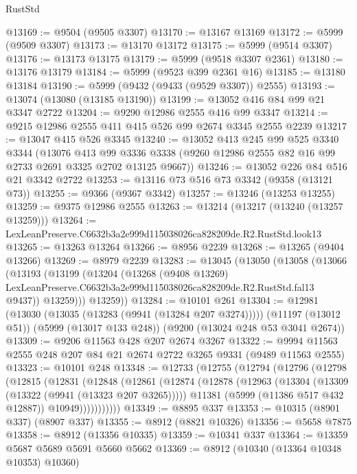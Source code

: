 \begin{lexlean}{RustStd}
\begin{coremodule}
@13169 := @9504 (@9505 @3307)
@13170 := @13167 @13169
@13172 := @5999 (@9509 @3307)
@13173 := @13170 @13172
@13175 := @5999 (@9514 @3307)
@13176 := @13173 @13175
@13179 := @5999 (@9518 @3307 @2361)
@13180 := @13176 @13179
@13184 := @5999 (@9523 @399 @2361 @16)
@13185 := @13180 @13184
@13190 := @5999 (@9432 (@9433 (@9529 @3307)) @2555)
@13193 := @13074 (@13080 (@13185 @13190))
@13199 := @13052 @416 @84 @99 @21 @3347 @2722
@13204 := @9290 @12986 @2555 @416 @99 @3347
@13214 := @9215 @12986 @2555 @411 @415 @526 @99 @2674 @3345 @2555 @2239
@13217 := @13047 @415 @526 @3345
@13240 := @13052
    @413
    @245
    @99
    @525
    @3340
    @3344
    (@13076
      @413
      @99
      @3336
      @3338
      (@9260 @12986 @2555 @82 @16 @99 @2733 @2691 @3325 @2702 @13125 @9667))
@13246 := @13052 @226 @84 @516 @21 @3342 @2722
@13253 := @13116 @73 @516 @73 @3342 (@9358 (@13121 @73))
@13255 := @9366 (@9367 @3342)
@13257 := @13246 (@13253 @13255)
@13259 := @9375 @12986 @2555
@13263 := @13214 (@13217 (@13240 (@13257 @13259)))
@13264 := LexLeanPreserve.C6632b3a2e999d115038026ca828209de.R2.RustStd.look13
@13265 := @13263 @13264
@13266 := @8956 @2239
@13268 := @13265 (@9404 @13266)
@13269 := @8979 @2239
@13283 := @13045
    (@13050
      (@13058
        (@13066
          (@13193
            (@13199
              (@13204
                (@13268
                  (@9408 @13269)
                  LexLeanPreserve.C6632b3a2e999d115038026ca828209de.R2.RustStd.fal13
                  @9437))
              @13259)))
        @13259))
@13284 := @10101 @261
@13304 := @12981
    (@13030 (@13035 (@13283 (@9941 (@13284 @207 @3274)))))
    (@11197 (@13012 @51))
    (@5999 (@13017 @133 @248))
    (@9200 (@13024 @248 @53 @3041 @2674))
@13309 := @9206 @11563 @428 @207 @2674 @3267
@13322 := @9994 @11563 @2555 @248 @207 @84 @21 @2674 @2722 @3265 @9331 (@9489 @11563 @2555)
@13323 := @10101 @248
@13348 := @12733
    (@12755
      (@12794
        (@12796
          (@12798
            (@12815
              (@12831
                (@12848
                  (@12861
                    (@12874
                      (@12878
                        (@12963
                          (@13304 (@13309 (@13322 (@9941 (@13323 @207 @3265)))))
                          @11381
                          (@5999 (@11386 @517 @432 @12887))
                          @10949)))))))))))
@13349 := @8895 @337
@13353 := @10315 (@8901 @337) (@8907 @337)
@13355 := @8912 (@8821 @10326)
@13356 := @5658 @7875
@13358 := @8912 (@13356 @10335)
@13359 := @10341 @337
@13364 := @13359 @5687 @5689 @5691 @5660 @5662
@13369 := @8912 (@10340 (@13364 @10348 @10353) @10360)

\end{coremodule}
\end{lexlean}
